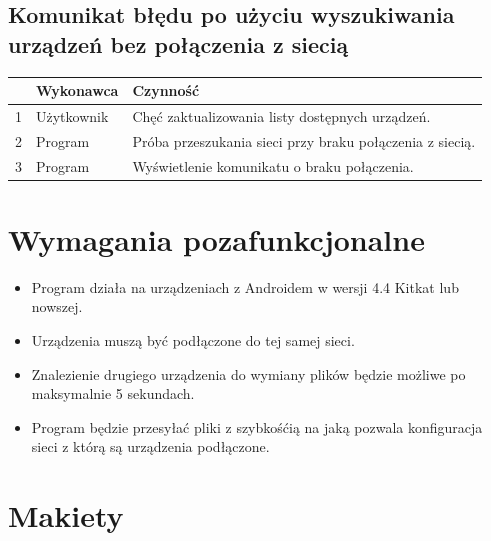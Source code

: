 \documentclass[12pt,a4paper]{article}
\begin{document}
\begin{center}
\subsection{Komunikat błędu po użyciu wyszukiwania urządzeń bez połączenia z siecią}
\begin{tabular}{|l|p{5em}|p{30em}|}
	\hline 
	 & Wykonawca & Czynność \\
	\hline
	1 & Użytkownik & Chęć zaktualizowania listy dostępnych urządzeń. \\
	\hline
	2 & Program & Próba przeszukania sieci przy braku połączenia z siecią. \\
	\hline
	3 & Program & Wyświetlenie komunikatu o braku połączenia. \\
	\hline
\end{tabular}
\end{center}

\section{Wymagania pozafunkcjonalne}

\begin{itemize}
	\item Program działa na urządzeniach z Androidem w wersji 4.4 Kitkat lub nowszej.
	\item Urządzenia muszą być podłączone do tej samej sieci.
	\item Znalezienie drugiego urządzenia do wymiany plików będzie możliwe po maksymalnie 5 sekundach.
	\item Program będzie przesyłać pliki z szybkośćią na jaką pozwala konfiguracja sieci z którą są urządzenia podłączone.
\end{itemize}
\pagebreak
\section{Makiety}
\end{document}
